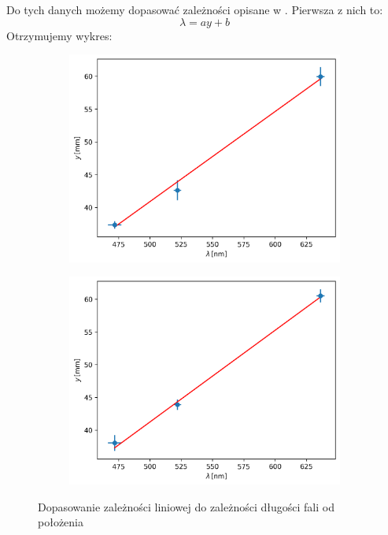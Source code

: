\documentclass[12pt]{article}
\begin{document}
Do tych danych możemy dopasować zależności opisane w \cite{skrypt}. Pierwsza z nich to:
\[
	\lambda = ay + b
\]
Otrzymujemy wykres:
\begin{figure}[H]
	\centering
	\begin{subfigure}{0.45\textwidth}
		\centering
		\includegraphics[width=\linewidth]{line_fit_distance_0}
		\label{fig:line_fit_distance_1}
	\end{subfigure}
	\hfill
	\begin{subfigure}{0.45\textwidth}
		\centering
		\includegraphics[width=\linewidth]{line_fit_distance_1}
		\label{fig:line_fit_distance_2}
	\end{subfigure}
	\caption{Dopasowanie zależności liniowej do zależności długości fali od położenia}
	\label{fig:line_fit_distance}
\end{figure}
\end{document}
